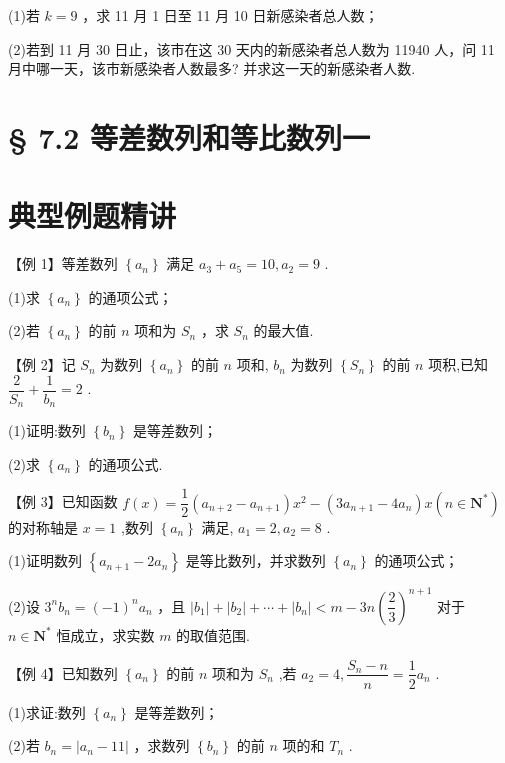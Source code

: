 (1)若 $k = 9$ ，求 11 月 1 日至 11 月 10 日新感染者总人数；

(2)若到 11 月 30 日止，该市在这 30 天内的新感染者总人数为 11940 人，问 11 月中哪一天，该市新感染者人数最多? 并求这一天的新感染者人数.

\section*{§ 7.2 等差数列和等比数列一}

\section*{典型例题精讲}

【例 1】等差数列 $\left\{  {a}_{n}\right\}$ 满足 ${a}_{3} + {a}_{5} = {10},{a}_{2} = 9$ .

(1)求 $\left\{  {a}_{n}\right\}$ 的通项公式；

(2)若 $\left\{  {a}_{n}\right\}$ 的前 $n$ 项和为 ${S}_{n}$ ，求 ${S}_{n}$ 的最大值.

【例 2】记 ${S}_{n}$ 为数列 $\left\{  {a}_{n}\right\}$ 的前 $n$ 项和, ${b}_{n}$ 为数列 $\left\{  {S}_{n}\right\}$ 的前 $n$ 项积,已知 $\dfrac{2}{{S}_{n}} + \dfrac{1}{{b}_{n}} = 2$ .

(1)证明:数列 $\left\{  {b}_{n}\right\}$ 是等差数列；

(2)求 $\left\{  {a}_{n}\right\}$ 的通项公式.

【例 3】已知函数 $f\left( x\right)  = \dfrac{1}{2}\left( {{a}_{n + 2} - {a}_{n + 1}}\right) {x}^{2} - \left( {3{a}_{n + 1} - 4{a}_{n}}\right) x\left( {n \in  {\mathbf{N}}^{ * }}\right)$ 的对称轴是 $x = 1$ ,数列 $\left\{  {a}_{n}\right\}$ 满足, ${a}_{1} = 2,{a}_{2} = 8$ .

(1)证明数列 $\left\{  {{a}_{n + 1} - 2{a}_{n}}\right\}$ 是等比数列，并求数列 $\left\{  {a}_{n}\right\}$ 的通项公式；

(2)设 ${3}^{n}{b}_{n} = {\left( -1\right) }^{n}{a}_{n}$ ，且 $\left| {b}_{1}\right|  + \left| {b}_{2}\right|  + \cdots  + \left| {b}_{n}\right|  < m - {3n}{\left( \dfrac{2}{3}\right) }^{n + 1}$ 对于 $n \in  {\mathbf{N}}^{ * }$ 恒成立，求实数 $m$ 的取值范围.

【例 4】已知数列 $\left\{  {a}_{n}\right\}$ 的前 $n$ 项和为 ${S}_{n}$ ,若 ${a}_{2} = 4,\dfrac{{S}_{n} - n}{n} = \dfrac{1}{2}{a}_{n}$ .

(1)求证:数列 $\left\{  {a}_{n}\right\}$ 是等差数列；

(2)若 ${b}_{n} = \left| {{a}_{n} - {11}}\right|$ ，求数列 $\left\{  {b}_{n}\right\}$ 的前 $n$ 项的和 ${T}_{n}$ .

